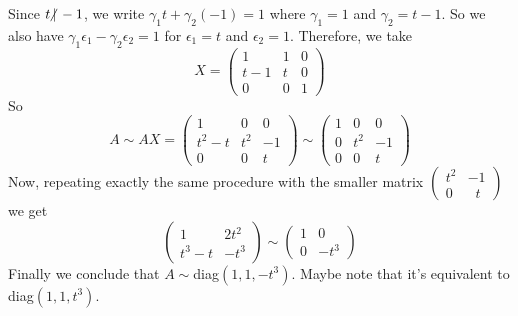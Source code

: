 Since $t\hspace{-4pt}\not|\hspace{2pt} -1$, we write $\gamma_1 t+\gamma_2(-1)=1$ where $\gamma_1=1$ and $\gamma_2=t-1$. So we also have $\gamma_1\epsilon_1-\gamma_2\epsilon_2=1$ for $\epsilon_1 = t$ and $\epsilon_2=1$. Therefore, we take
\begin{equation}
    X= \begin{pmatrix}
        1 & 1 & 0 \\
        t-1 & t & 0\\
        0 & 0 & 1
    \end{pmatrix}
\end{equation}
So 
\begin{equation}
   A\sim AX =\begin{pmatrix}
       1&0&0\\
       t^2-t&t^2&-1\\
       0&0&t
   \end{pmatrix}\sim
   \begin{pmatrix}
       1&0&0\\
       0&t^2&-1\\
       0&0&t
   \end{pmatrix}
\end{equation}
Now, repeating exactly the same procedure with the smaller matrix 
$\begin{pmatrix}
    t^2&-1\\
    0&\;\;t
\end{pmatrix}$ we get 
\begin{equation}
    \begin{pmatrix}
    1 & 2t^2\\
    t^3-t&-t^3
\end{pmatrix}\sim
\begin{pmatrix}
    1 & 0\\
    0&-t^3
\end{pmatrix}
\end{equation}
Finally we conclude that $A\sim$diag$(1,1,-t^3)$. Maybe note that it's equivalent to diag$(1,1,t^3)$.\par

